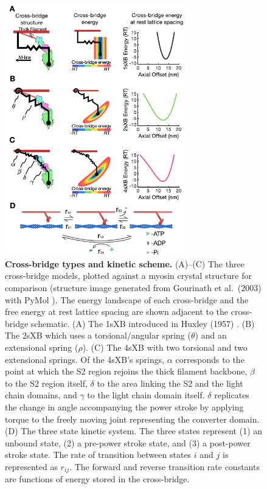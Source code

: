 \documentclass[10pt]{article}
\newcommand{\citep}[1]{\cite{#1}} %
\begin{document}
\begin{figure}[!ht]
    \begin{center}
    \includegraphics[width=3.1in]{../imgs/fig_xb_types.pdf}
    \caption{ \textbf{Cross-bridge types and kinetic scheme.} 
        (A)--(C) The three cross-bridge models, plotted against a myosin crystal structure for comparison (structure image generated from Gourinath et al.~(2003) \protect\citep{Gourinath2003} with PyMol \protect\citep{pymol}).
        The energy landscape of each cross-bridge and the free energy at rest lattice spacing are shown adjacent to the cross-bridge schematic.
        (A) The 1sXB introduced in Huxley (1957) \protect\citep{Huxley1957}. 
        (B) The 2sXB which uses a torsional/angular spring ($\theta$) and an extensional spring ($\rho$). 
        (C) The 4sXB with two torsional and two extensional springs.
        Of the 4sXB's springs, $\alpha$ corresponds to the point at which the S2 region rejoins the thick filament backbone, $\beta$ to the S2 region itself, $\delta$ to the area linking the S2 and the light chain domains, and $\gamma$ to the light chain domain itself.
        $\delta$ replicates the change in angle accompanying the power stroke by applying torque to the freely moving joint representing the converter domain.
        (D)  The three state kinetic system. 
        The three states represent (1) an unbound state, (2) a pre-power stroke state, and (3) a post-power stroke state. 
        The rate of transition between states $i$ and $j$ is represented as $r_{ij}$. 
        The forward and reverse transition rate constants are functions of energy stored in the cross-bridge. 
        \label{fig_xb_types}
        }
    \end{center}
\end{figure}
\end{document}
